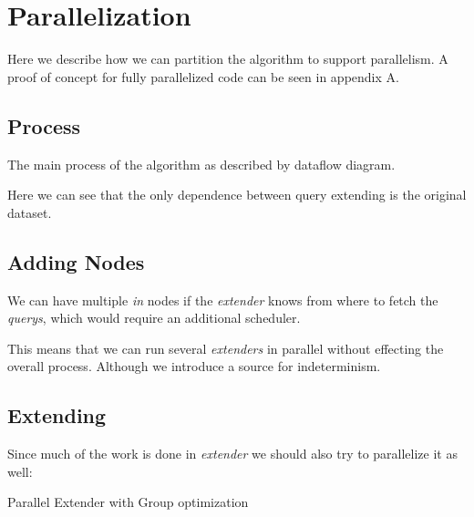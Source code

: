 \chapter{Parallelization}

Here we describe how we can partition the algorithm to support parallelism.
A proof of concept for fully parallelized code can be seen in appendix A.

\section{Process}

The main process of the algorithm as described by dataflow diagram.\cite{Kahn74,Lee95}

\begin{figure}[H]
	
\end{figure}


Here we can see that the only dependence between query extending is the original dataset.

\section{Adding Nodes}

We can have multiple \emph{in} nodes if the \emph{extender} knows from where to fetch the \emph{querys}, which would require an additional scheduler.

This means that we can run several \emph{extenders} in parallel without effecting the overall process. Although we introduce a source for indeterminism.

\section{Extending}

Since much of the work is done in \emph{extender} we should also try to parallelize it as well:

\begin{algorithm}[H]
	\caption{Parallel Extender with Group optimization}
\begin{algorithmic}[1]

\end{algorithmic}
\end{algorithm}

